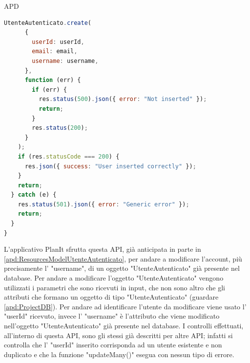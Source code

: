 \begin{listaPersonale} {APD}
\begin{listaPersonale2}[APD]{}
\begin{lstlisting}[language=JavaScript]
    UtenteAutenticato.create(
      {
        userId: userId,
        email: email,
        username: username,
      },
      function (err) {
        if (err) {
          res.status(500).json({ error: "Not inserted" });
          return;
        }
        res.status(200);
      }
    );
    if (res.statusCode === 200) {
      res.json({ success: "User inserted correctly" });
    }
    return;
  } catch (e) {
    res.status(501).json({ error: "Generic error" });
    return;
  }
}
                \end{lstlisting}
                \newpage
                L'applicativo PlanIt sfrutta questa API, già anticipata in parte in \ref{apd:ResourcesModelUtenteAutenticato}, per andare a modificare l'account, più precisamente l' "username", di un oggetto "UtenteAutenticato" già presente nel database. Per andare a modificare l'oggetto "UtenteAutenticato" vengono utilizzati i parametri che sono ricevuti in input, che non sono altro che gli attributi che formano un oggetto di tipo "UtenteAutenticato" (guardare \ref{apd:ProjectDB}). Per andare ad identificare l'utente da modificare viene usato l' "userId" ricevuto, invece l' "username" è l'attributo che viene modificato nell'oggetto "UtenteAutenticato" già presente nel database. I controlli effettuati, all'interno di questa API, sono gli stessi già descritti per altre API; infatti si controlla che l' "userId" inserito corrisponda ad un utente esistente e non duplicato e che la funzione "updateMany()" esegua con nessun tipo di errore.

\end{listaPersonale2}
\end{listaPersonale}
